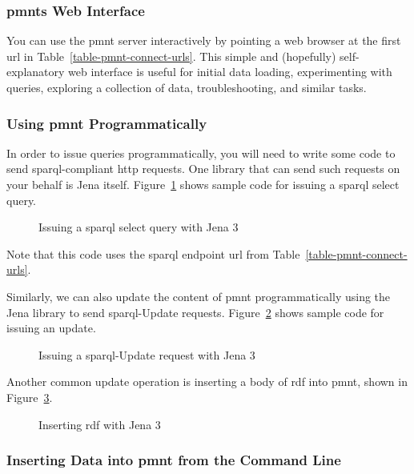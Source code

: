 \subsubsection{\acp{pmnt} Web Interface}

You can use the \ac{pmnt} server interactively by pointing a web browser at the first \ac{url} in Table~\ref{table-pmnt-connect-urls}.  This simple and (hopefully) self-explanatory web interface is useful for initial data loading, experimenting with queries, exploring a collection of data, troubleshooting, and similar tasks.

\subsubsection{Using \ac{pmnt} Programmatically}

In order to issue queries programmatically, you will need to write some code to send \ac{sparql}-compliant \ac{http} requests.  One library that can send such requests on your behalf is Jena itself.  Figure~\ref{figure-sparql-select-query-with-jena3} shows sample code for issuing a \ac{sparql} select query.
\begin{figure}[htbp]
	\footnotesize
	\caption{Issuing a \acs*{sparql} select query with Jena 3}
	\label{figure-sparql-select-query-with-jena3}
\end{figure}
Note that this code uses the \ac{sparql} endpoint \ac{url} from Table~\ref{table-pmnt-connect-urls}.

Similarly, we can also update the content of \ac{pmnt} programmatically using the Jena library to send \ac{sparql}-Update requests.  Figure~\ref{figure-sparql-update-with-jena-3} shows sample code for issuing an update.
\begin{figure}[htbp]
	\footnotesize
	\caption{Issuing a \acs*{sparql}-Update request with Jena 3}
	\label{figure-sparql-update-with-jena-3}
\end{figure}

Another common update operation is inserting a body of \ac{rdf} into \ac{pmnt}, shown in Figure~\ref{figure-sparql-insert-with-jena-3}.
\begin{figure}[htbp]
	\footnotesize
	\caption{Inserting \acs*{rdf} with Jena 3}
	\label{figure-sparql-insert-with-jena-3}
\end{figure}

\subsubsection{Inserting Data into \ac{pmnt} from the Command Line}

